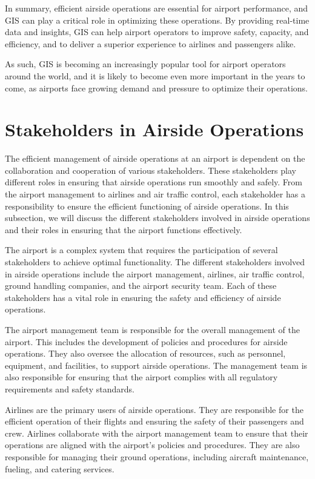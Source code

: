     In summary, efficient airside operations are essential for airport performance, and GIS can play a critical role in optimizing these operations. By providing real-time data and insights, GIS can help airport operators to improve safety, capacity, and efficiency, and to deliver a superior experience to airlines and passengers alike.

    As such, GIS is becoming an increasingly popular tool for airport operators around the world, and it is likely to become even more important in the years to come, as airports face growing demand and pressure to optimize their operations.
    
\section{Stakeholders in Airside Operations}

The efficient management of airside operations at an airport is dependent on the collaboration and cooperation of various stakeholders. These stakeholders play different roles in ensuring that airside operations run smoothly and safely. From the airport management to airlines and air traffic control, each stakeholder has a responsibility to ensure the efficient functioning of airside operations. In this subsection, we will discuss the different stakeholders involved in airside operations and their roles in ensuring that the airport functions effectively.

The airport is a complex system that requires the participation of several stakeholders to achieve optimal functionality. The different stakeholders involved in airside operations include the airport management, airlines, air traffic control, ground handling companies, and the airport security team. Each of these stakeholders has a vital role in ensuring the safety and efficiency of airside operations.

The airport management team is responsible for the overall management of the airport. This includes the development of policies and procedures for airside operations. They also oversee the allocation of resources, such as personnel, equipment, and facilities, to support airside operations. The management team is also responsible for ensuring that the airport complies with all regulatory requirements and safety standards.

Airlines are the primary users of airside operations. They are responsible for the efficient operation of their flights and ensuring the safety of their passengers and crew. Airlines collaborate with the airport management team to ensure that their operations are aligned with the airport's policies and procedures. They are also responsible for managing their ground operations, including aircraft maintenance, fueling, and catering services.

